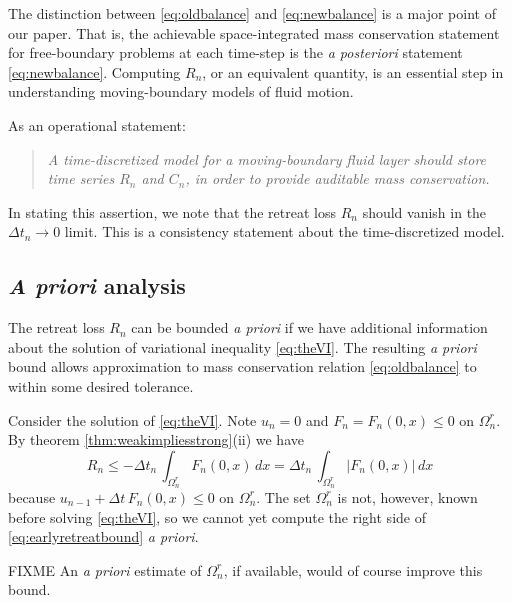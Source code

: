 \documentclass[final,leqno,onefignum,onetabnum]{siamltex1213bueler}
\begin{document}
The distinction between \eqref{eq:oldbalance} and \eqref{eq:newbalance} is a major point of our paper.  That is, the achievable space-integrated mass conservation statement for free-boundary problems at each time-step is the \emph{a posteriori} statement \eqref{eq:newbalance}.  Computing $R_n$, or an equivalent quantity, is an essential step in understanding moving-boundary models of fluid motion.

As an operational statement:
\begin{quote}
\emph{A time-discretized model for a moving-boundary fluid layer should store time series $R_n$ and $C_n$, in order to provide auditable mass conservation.}
\end{quote}
In stating this assertion, we note that the retreat loss $R_n$ should vanish in the $\Delta t_n\to 0$ limit.  This is a consistency statement about the time-discretized model.

\subsection{\emph{A priori} analysis} \label{subsec:apriori}   The retreat loss $R_n$ can be bounded \emph{a priori} if we have additional information about the solution of variational inequality \eqref{eq:theVI}.  The resulting \emph{a priori} bound allows approximation to mass conservation relation \eqref{eq:oldbalance} to within some desired tolerance.

Consider the solution of \eqref{eq:theVI}.  Note $u_n=0$ and $F_n=F_n(0,x)\le 0$ on $\Omega_n^r$.  By theorem \ref{thm:weakimpliesstrong}(ii) we have
\begin{equation}
R_n \le - \Delta t_n\,\int_{\Omega_n^r} F_n(0,x)\,dx = \Delta t_n\,\int_{\Omega_n^r} |F_n(0,x)|\,dx  \label{eq:earlyretreatbound}
\end{equation}
because $u_{n-1} + \Delta t\,F_n(0,x) \le 0$ on $\Omega_n^r$.  The set $\Omega_n^r$ is not, however, known before solving \eqref{eq:theVI}, so we cannot yet compute the right side of \eqref{eq:earlyretreatbound} \emph{a priori}.

FIXME  An \emph{a priori} estimate of $\Omega_n^r$, if available, would of course improve this bound.
\end{document}
